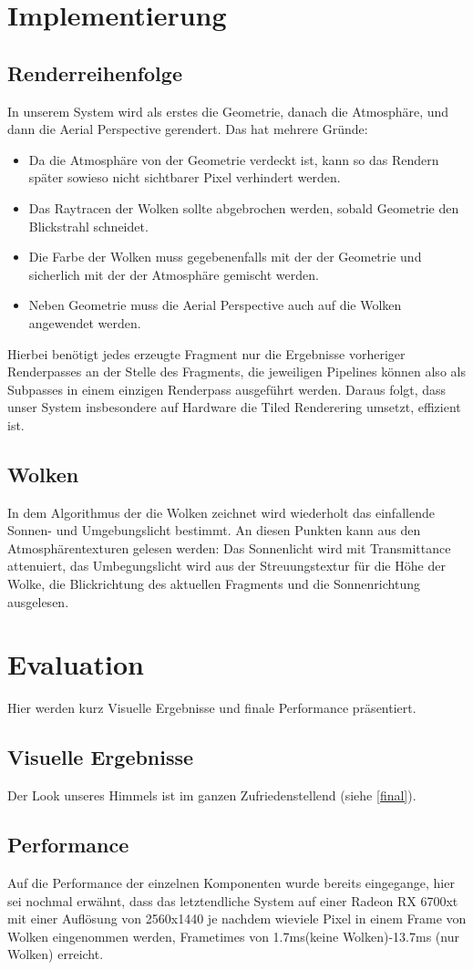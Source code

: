 \section{Implementierung}
\subsection{Renderreihenfolge}
In unserem System wird als erstes die Geometrie, danach die Atmosphäre, und dann die Aerial Perspective gerendert. Das
hat mehrere Gründe:
\begin{itemize}
	\item Da die Atmosphäre von der Geometrie verdeckt ist, kann so das Rendern später sowieso nicht sichtbarer Pixel
	verhindert werden.
	\item Das Raytracen der Wolken sollte abgebrochen werden, sobald Geometrie den Blickstrahl schneidet.
	\item Die Farbe der Wolken muss gegebenenfalls mit der der Geometrie und sicherlich mit der der Atmosphäre gemischt
	werden.
	\item Neben Geometrie muss die Aerial Perspective auch auf die Wolken angewendet werden.
\end{itemize}
Hierbei benötigt jedes erzeugte Fragment nur die Ergebnisse vorheriger Renderpasses an der Stelle des Fragments, die
jeweiligen Pipelines können also als Subpasses in einem einzigen Renderpass ausgeführt werden. Daraus folgt, dass unser
System insbesondere auf Hardware die Tiled Renderering umsetzt, effizient ist.

\subsection{Wolken}
In dem Algorithmus der die Wolken zeichnet wird wiederholt das einfallende Sonnen- und Umgebungslicht bestimmt. An
diesen Punkten kann aus den Atmosphärentexturen gelesen werden: Das Sonnenlicht wird mit Transmittance attenuiert, das
Umbegungslicht wird aus der Streuungstextur für die Höhe der Wolke, die Blickrichtung des aktuellen Fragments und die
Sonnenrichtung ausgelesen.

\section{Evaluation}
Hier werden kurz Visuelle Ergebnisse und finale Performance präsentiert.
\subsection{Visuelle Ergebnisse}
Der Look unseres Himmels ist im ganzen Zufriedenstellend (siehe \cref{final}).

\subsection{Performance}
Auf die Performance der einzelnen Komponenten wurde bereits eingegange, hier sei nochmal erwähnt, dass das letztendliche
System auf einer Radeon RX 6700xt mit einer Auflösung von 2560x1440 je nachdem wieviele Pixel in einem Frame von Wolken
eingenommen werden, Frametimes von 1.7ms(keine Wolken)-13.7ms (nur Wolken) erreicht.
